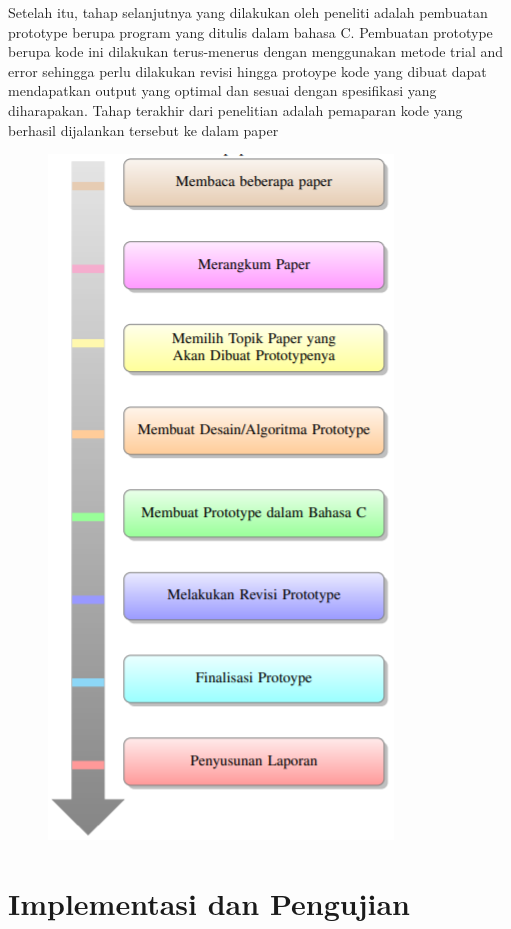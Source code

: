 \documentclass[conference]{IEEEtran}
\begin{document}
Setelah itu, tahap selanjutnya yang dilakukan oleh peneliti
adalah pembuatan prototype berupa program yang ditulis
dalam bahasa C. Pembuatan prototype berupa kode ini dilakukan terus-menerus dengan menggunakan metode trial and
error sehingga perlu dilakukan revisi hingga protoype kode
yang dibuat dapat mendapatkan output yang optimal dan
sesuai dengan spesifikasi yang diharapakan. Tahap terakhir
dari penelitian adalah pemaparan kode yang berhasil dijalankan tersebut ke dalam paper
\begin{figure} [htbp]
    \includegraphics{gambar/Metodologi Penelitian.png}
    \centering
\end{figure}

\section{Implementasi dan Pengujian}
\end{document}
